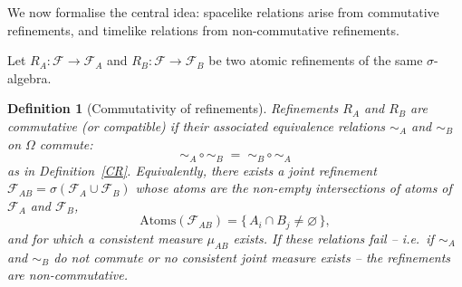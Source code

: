 \documentclass[
 amsmath,amssymb,
  onecolumn %
]{revtex4-2}
\newtheorem{definition}[theorem]{Definition}
\begin{document}
We now formalise the central idea: spacelike relations arise from commutative refinements, and timelike relations from non-commutative refinements.

Let $R_A : \mathcal F \to \mathcal F_A$ and $R_B : \mathcal F \to \mathcal F_B$ be two atomic refinements of the same $\sigma$-algebra.

\begin{definition}[Commutativity of refinements]
Refinements $R_A$ and $R_B$ are \emph{commutative} (or \emph{compatible}) if their associated equivalence relations $\!\sim_A$ and $\!\sim_B$ on $\Omega$ commute:
\[
\sim_A \circ \sim_B \;=\; \sim_B \circ \sim_A
\]
as in Definition~\ref{CR}.
Equivalently, there exists a joint refinement $\mathcal F_{AB} = \sigma(\mathcal F_A \cup \mathcal F_B)$ whose atoms are the non-empty intersections of atoms of $\mathcal F_A$ and $\mathcal F_B$,
\[
\text{Atoms}(\mathcal F_{AB}) = \{\, A_i \cap B_j \neq \varnothing \,\},
\]
and for which a consistent measure $\mu_{AB}$ exists.
If these relations fail -- i.e.\ if $\sim_A$ and $\sim_B$ do not commute or no consistent joint measure exists -- the refinements are \emph{non-commutative}.
\end{definition}
\end{document}

